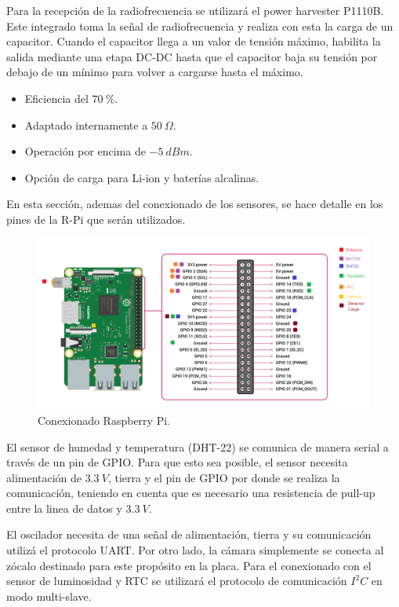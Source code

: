 Para la recepción de la radiofrecuencia se utilizará el power harvester P1110B. Este integrado toma la señal de radiofrecuencia y realiza con esta la carga de un capacitor. Cuando el capacitor llega a un valor de tensión máximo, habilita la salida mediante una etapa DC-DC hasta que el capacitor baja su tensión por debajo de un mínimo para volver a cargarse hasta el máximo.


\begin{itemize}
\item Eficiencia del $70 \ \%$.
\item Adaptado internamente a $50 \ \Omega$.
\item Operación por encima de $-5 \ dBm$.
\item Opción de carga para Li-ion y baterías alcalinas.
\end{itemize}


En esta sección, ademas del conexionado de los sensores, se hace detalle en los pines de la R-Pi que serán utilizados.

\begin{figure}[H]
	\centering
	\includegraphics[width=0.9\linewidth]{ImagenesIngenieria de Detalle/Conexionado_rpi}		
	\caption{Conexionado Raspberry Pi.}
	\label{fig:conexionado_Rpi}
\end{figure}

El sensor de humedad y temperatura (DHT-22) se comunica de manera serial a través de un pin de GPIO. Para que esto sea posible, el sensor necesita alimentación de $3.3 \ V$, tierra y el pin de GPIO por donde se realiza la comunicación, teniendo en cuenta que es necesario una resistencia de pull-up entre la linea de datos y $3.3 \ V$.

El oscilador necesita de una señal de alimentación, tierra y su comunicación utilizá el protocolo UART. Por otro lado, la cámara simplemente se conecta al zócalo destinado para este propósito en la placa. Para el conexionado con el sensor de luminosidad y RTC se utilizará el protocolo de comunicación $I^2C$ en modo multi-slave.

